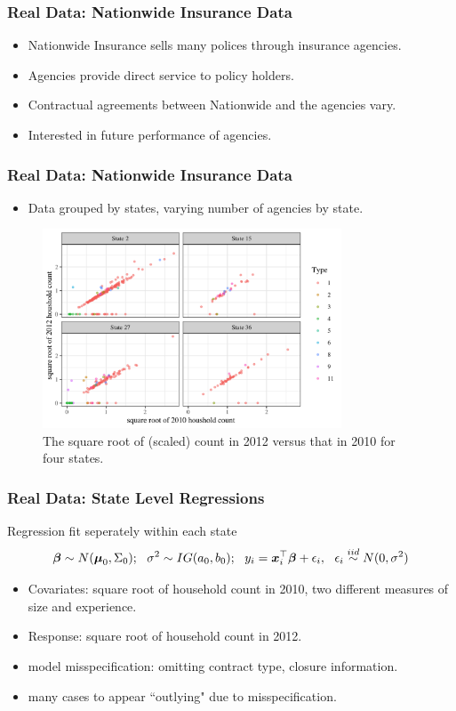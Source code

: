 \documentclass{beamer}
\def\bbeta{\mbox{\boldmath $\beta$}}
\def\bmu{\mbox{\boldmath $\mu$}}
\newcommand{\bx}{\mbox{\boldmath $x$}}
\newcommand{\iid}{\stackrel{iid}{\sim}}
\begin{document}
\begin{frame}
\frametitle{Real Data: Nationwide Insurance Data}
\begin{itemize}
	\item Nationwide Insurance sells many polices through insurance agencies.
	\item Agencies provide direct service to policy holders.
	\item Contractual agreements between Nationwide and the agencies vary.
	\item Interested in future performance of agencies. 
\end{itemize}
\end{frame}


\begin{frame}
\frametitle{Real Data: Nationwide Insurance Data}
\begin{itemize}
\item Data grouped by states, varying number of agencies by state.
\end{itemize}
	\begin{figure}[t]
		\centering
		\includegraphics[width=3.5in]{scatter_by_state.png}
		\caption{The square root of (scaled) count in 2012 versus that in 2010 for four states.}
		\label{fig:ctVct}
	\end{figure}
\end{frame}


\begin{frame}
\frametitle{Real Data: State Level Regressions}
Regression fit seperately within each state
\begin{equation*}
\label{eq:regModel}
\bbeta\sim N(\bmu_0, \Sigma_0);\ \ \sigma^2\sim IG(a_0,b_0);\ \  
y_{i}=\bx_{i}^{\top}\bbeta+\epsilon_{i},\ \ \epsilon_{i}\iid N(0, \sigma^2)
\end{equation*}	
\begin{itemize}
	\item Covariates: square root of household count in 2010, two different measures of size and experience.
	\item Response: square root of household count in 2012.
	\item model misspecification: omitting contract type, closure information. 
	\item many cases to appear ``outlying" due to misspecification.
\end{itemize}
\end{frame}
\end{document}
